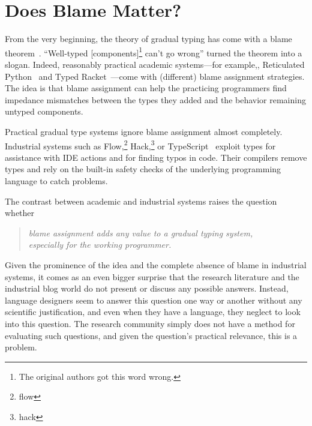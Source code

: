 \section{Does Blame Matter?}

From the very beginning, the theory of gradual typing has come with a blame
theorem~\cite{mf-toplas-2009, tf-dls-2006}. ``Well-typed [components]\footnote{The
original authors got this word wrong.} can't go wrong'' turned the theorem into a
slogan. Indeed, reasonably practical academic systems---for example,, Reticulated
Python~\cite{vsc-dls-2019, vss-popl-2017, vksb-dls-2014} and Typed
Racket~\cite{tf-dls-2006,tf-popl-2008,tfffgksst-snapl-2017,tf-icfp-2010}---come
with (different) blame assignment strategies. The idea is that blame assignment
can help the practicing programmers find impedance mismatches between the types
they added and the behavior remaining untyped components.

Practical gradual type systems ignore blame assignment almost completely.
Industrial systems such as Flow,\footnote{flow} Hack,\footnote{hack} or
TypeScript~\cite{ts} exploit types for assistance with IDE actions and for finding
typos in code. Their compilers remove types and rely on the built-in safety checks
of the underlying programming language to catch problems.

The contrast between academic and industrial systems raises the question whether
\begin{quote}
 \it
 blame assignment adds any value to a gradual typing system, \\
 especially for the working programmer.
\end{quote}
Given the prominence of the idea and the complete absence of blame in industrial
systems, it comes as an even bigger surprise that the research literature and the
industrial blog world do not present or discuss any possible answers.  Instead,
language designers seem to answer this question one way or another without any
scientific justification, and even when they have a language, they neglect to look
into this question. The research community simply does not have a method for
evaluating such questions, and given the question's practical relevance, this is a
problem.

